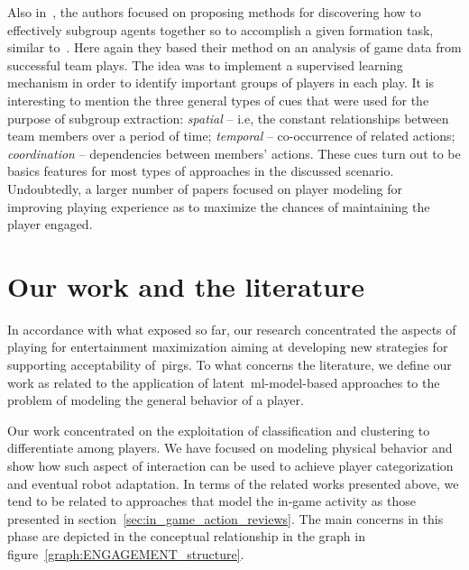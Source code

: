 Also in~\cite{laviersa_using_2014}, the authors focused on proposing methods for discovering how to effectively  subgroup agents together so to accomplish a given formation task, similar to~\cite{stone_task_1999}. Here again they based their method on an analysis of game data from successful team plays. The idea was to implement a supervised learning mechanism in order to identify important groups of players in each play. It is interesting to mention the three general types of cues that were used for the purpose of subgroup extraction: \textit{spatial} -- i.e, the constant relationships between team members over a period of time; \textit{temporal} -- co-occurrence of related actions; \textit{coordination} -- dependencies between members' actions. These cues turn out to be basics features for most types of approaches in the discussed scenario. Undoubtedly, a larger number of papers focused on player modeling for improving playing experience as to maximize the chances of maintaining the player engaged. 

\section{Our work and the literature}
In accordance with what exposed so far, our research concentrated the aspects of playing for entertainment maximization aiming at developing new strategies for supporting acceptability of~\gls{pirg}s. To what concerns the literature, we define our work as related to the application of latent~\gls{ml}-model-based approaches %
to the problem of modeling the general behavior of a player. 

Our work concentrated on the exploitation of classification and clustering to differentiate among players. We have focused on modeling physical behavior and show how such aspect of interaction can be used to achieve player categorization and eventual robot adaptation. In terms of the related works presented above, we tend to be related to approaches that model the in-game activity as those presented in section~\ref{sec:in_game_action_reviews}. The main concerns in this phase are depicted in the conceptual relationship in the graph in figure~\ref{graph:ENGAGEMENT_structure}. %

